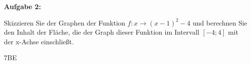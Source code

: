 \documentclass[a4paper,12pt]{article}
\newcommand{\Aufgabe}[1]{
  {
  \vspace*{0.5cm}
  \textsf{\textbf{Aufgabe #1}}
  \vspace*{0.2cm}
  
  }
}
\begin{document}
\Aufgabe{2:}
Skizzieren Sie der Graphen der Funktion  $f: x \rightarrow (x-1)^2-4$ und berechnen Sie den Inhalt der Fläche, die der Graph dieser Funktion im Intervall $[-4;4]$ mit der x-Achse einschließt.

\vspace{1cm}


\begin{flushright}7BE \end{flushright}


\end{document}
